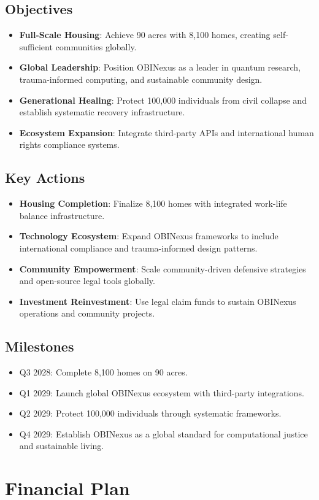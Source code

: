 \documentclass[12pt]{article}\usepackage[a4paper,margin=1in]{geometry}
\begin{document}
\subsection*{Objectives}
\begin{itemize}
    \item \textbf{Full-Scale Housing}: Achieve 90 acres with 8,100 homes, creating self-sufficient communities globally.
    \item \textbf{Global Leadership}: Position OBINexus as a leader in quantum research, trauma-informed computing, and sustainable community design.
    \item \textbf{Generational Healing}: Protect 100,000 individuals from civil collapse and establish systematic recovery infrastructure.
    \item \textbf{Ecosystem Expansion}: Integrate third-party APIs and international human rights compliance systems.
\end{itemize}\subsection*{Key Actions}
\begin{itemize}
    \item \textbf{Housing Completion}: Finalize 8,100 homes with integrated work-life balance infrastructure.
    \item \textbf{Technology Ecosystem}: Expand OBINexus frameworks to include international compliance and trauma-informed design patterns.
    \item \textbf{Community Empowerment}: Scale community-driven defensive strategies and open-source legal tools globally.
    \item \textbf{Investment Reinvestment}: Use legal claim funds to sustain OBINexus operations and community projects.
\end{itemize}\subsection*{Milestones}
\begin{itemize}
    \item Q3 2028: Complete 8,100 homes on 90 acres.
    \item Q1 2029: Launch global OBINexus ecosystem with third-party integrations.
    \item Q2 2029: Protect 100,000 individuals through systematic frameworks.
    \item Q4 2029: Establish OBINexus as a global standard for computational justice and sustainable living.
\end{itemize}\section*{Financial Plan}
\end{document}
